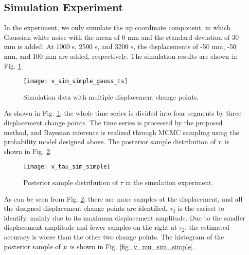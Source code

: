 \documentclass[final,3p,times]{elsarticle}
\begin{document}
	\subsection{Simulation Experiment}
	In the experiment, we only simulate the up coordinate component, in which Gaussian white noise with the mean of 0 mm and the standard deviation of 30 mm is added.
	At 1000 s, 2500 s, and 3200 s, the displacements of -50 mm, -50 mm, and 100 mm are added, respectively. 
	The simulation results are shown in Fig. \ref{fig_v_sim_simple_gauss_ts}.
	\begin{figure}[htbp]
		\centering
		\texttt{[image: v\_sim\_simple\_gauss\_ts]}
		\caption{Simulation data with multiple displacement change points.}
		\label{fig_v_sim_simple_gauss_ts}
	\end{figure} 
	As shown in Fig. \ref{fig_v_sim_simple_gauss_ts}, the whole time series is divided into four segments by three displacement change points. 
	\textcolor{r_s}{The time series is processed by the proposed method, and Bayesian inference is realized through MCMC sampling using the probability model designed above.} 
	The posterior sample distribution of $\bf{\tau}$ is shown in Fig. \ref{fig_v_tau_sim_simple}.
	\begin{figure}[htbp]
		\centering
		\texttt{[image: v\_tau\_sim\_simple]}
		\caption{Posterior sample distribution of $\tau$ in the simulation experiment.}
		\label{fig_v_tau_sim_simple}
	\end{figure} 
	
	As can be seen from Fig. \ref{fig_v_tau_sim_simple}, \textcolor{r_s}{there are more samples at the displacement, and} all the designed displacement change points are identified. 
	$\tau_3$ is the easiest to \textcolor{r_s}{identify}, mainly due to \textcolor{r_s}{its maximum} displacement amplitude. 
	  \textcolor{r_s}{Due to the smaller displacement amplitude and fewer samples on the right at $\tau_2$}, the estimated accuracy is worse than the other two change points.
	The histogram of the posterior sample of $\bf{\mu}$ is shown in Fig. \ref{fig_v_mu_sim_simple}.
	
\end{document}
